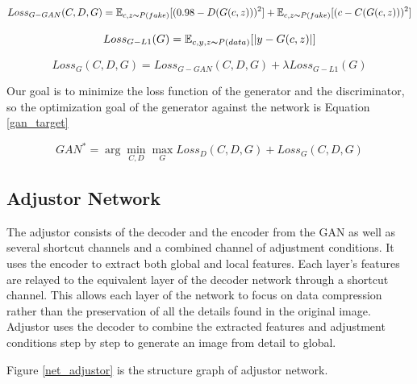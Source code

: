 \begin{equation}
    Loss_{G-GAN}(C,D,G)=
    \mathbb{E}_{c,z\thicksim P(fake)}[(0.98-D(G(c,z)))^2]+
    \mathbb{E}_{c,z\thicksim P(fake)}[(c-C(G(c,z)))^2]
    \label{loss_g_gan}
\end{equation}

\begin{equation}
    Loss_{G-L1}(G)=
    \mathbb{E}_{c,y,z\thicksim P(data)}[|y-G(c,z)|]
    \label{loss_g_l1}
\end{equation}

\begin{equation}
    Loss_{G}(C,D,G)=
    Loss_{G-GAN}(C,D,G)+
    \lambda Loss_{G-L1}(G)
    \label{loss_g}
\end{equation}

Our goal is to minimize the loss function of the generator and the discriminator,
    so the optimization goal of the generator against the network is Equation \eqref{gan_target}

\begin{equation}
    GAN^*=\arg \min_{C,D} \max_{G}Loss_{D}(C,D,G)+Loss_{G}(C,D,G)
    \label{gan_target}
\end{equation}


\subsection{Adjustor Network}%
The adjustor consists of the decoder and the encoder from the GAN as well as several shortcut channels and a combined channel of adjustment conditions.
It uses the encoder to extract both global and local features.
Each layer’s features are relayed to the equivalent layer of the decoder network through a shortcut channel.
This allows each layer of the network to focus on data compression rather than the preservation of all the details found in the original image.
Adjustor uses the decoder to combine the extracted features and adjustment conditions step by step to generate an image from detail to global.

Figure \ref{net_adjustor} is the structure graph of adjustor network.

